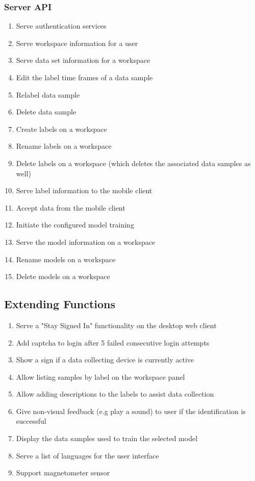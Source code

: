 \subsubsection{Server API}
\begin{enumerate}[resume*]
    \item Serve authentication services
    \item Serve workspace information for a user
    \item Serve data set information for a workspace
    \item Edit the label time frames of a data sample
    \item Relabel data sample
    \item Delete data sample
    \item Create labels on a workspace
    \item Rename labels on a workspace
    \item Delete labels on a workspace (which deletes the associated data samples as well)
    \item Serve label information to the mobile client
    \item Accept data from the mobile client
    \item Initiate the configured model training
    \item Serve the model information on a workspace
    \item Rename models on a workspace
    \item Delete models on a workspace
\end{enumerate}

\subsection{Extending Functions}
\begin{enumerate}[resume*]
    \item Serve a "Stay Signed In" functionality on the desktop web client
    \item Add captcha to login after 5 failed consecutive login attempts
    \item Show a sign if a data collecting device is currently active
    \item Allow listing samples by label on the workspace panel
    \item Allow adding descriptions to the labels to assist data collection
    \item \label{/F480/} Give non-visual feedback (e.g play a sound) to user if the identification is successful
    \item Display the data samples used to train the selected model
    \item Serve a list of languages for the user interface
    \item Support magnetometer sensor
\end{enumerate}